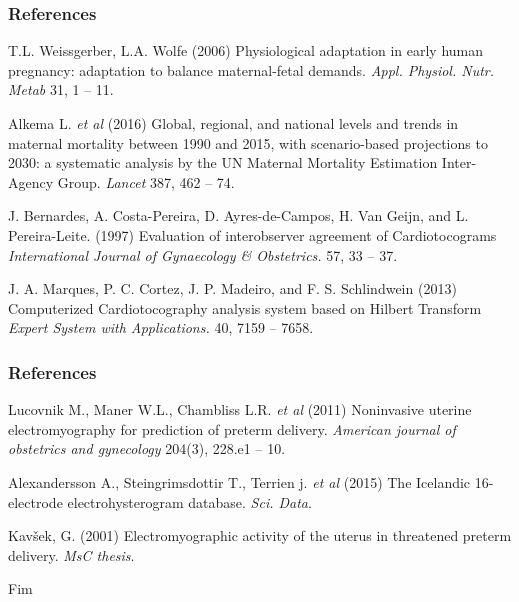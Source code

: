 \documentclass{beamer}
\begin{document}
\begin{frame}
\frametitle{References}
\footnotesize{
\begin{thebibliography}{99} %
 T.L. Weissgerber, L.A. Wolfe (2006)
\newblock Physiological adaptation in early human pregnancy: adaptation to balance maternal-fetal demands.
\newblock \emph{Appl. Physiol. Nutr. Metab} 31, 1 -- 11.

 Alkema L. {\em et al} (2016)
\newblock Global, regional, and national levels and trends in maternal mortality between 1990 and 2015, with scenario-based projections to 2030: a systematic analysis by the UN Maternal Mortality Estimation Inter-Agency Group.
\newblock \emph{Lancet} 387, 462 -- 74.

 J. Bernardes, A. Costa-Pereira, D. Ayres-de-Campos, H. Van Geijn, and L. Pereira-Leite. (1997)
\newblock Evaluation of interobserver agreement of Cardiotocograms
\newblock \emph{International Journal of Gynaecology \& Obstetrics.} 57, 33 -- 37.

 J. A. Marques, P. C. Cortez, J. P. Madeiro, and F. S. Schlindwein (2013)
\newblock Computerized Cardiotocography analysis system based on Hilbert Transform
\newblock \emph{Expert System with Applications.} 40, 7159 -- 7658.
\end{thebibliography}
}
\end{frame}


\begin{frame}
	\frametitle{References}
	\footnotesize{
		\begin{thebibliography}{99} %
						
			 Lucovnik M., Maner W.L., Chambliss L.R. {\em et al} (2011)
			\newblock Noninvasive uterine electromyography for prediction of preterm delivery.
			\newblock \emph{American journal of obstetrics and gynecology} 204(3),  228.e1 -- 10.
			
			 Alexandersson A., Steingrimsdottir T., Terrien j. {\em et al} (2015)
			\newblock The Icelandic 16-electrode electrohysterogram database.
			\newblock \emph{Sci. Data}.
			
			 Kavšek, G. (2001)
			\newblock Electromyographic activity of the uterus in threatened preterm delivery.
			\newblock \emph{MsC thesis}.
			
			
		\end{thebibliography}
	}
\end{frame}


\begin{frame}
\Huge{\centerline{Fim}}
\end{frame}

\end{document}
